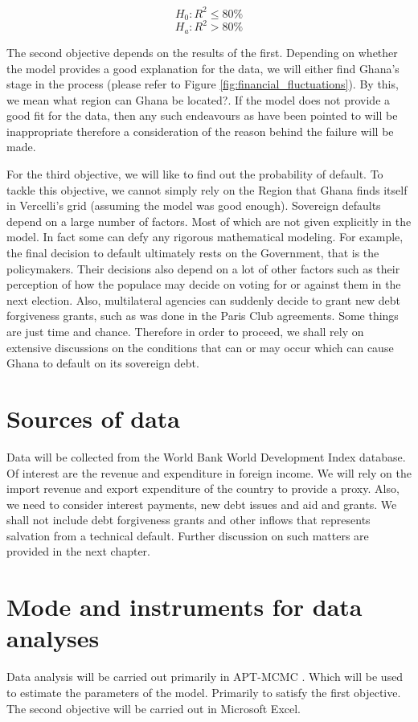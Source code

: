 \documentclass[a4paper, 12pt]{article}
\begin{document}
		\begin{equation*}
		H_0: R^2 \leq 80\%
		\end{equation*}
		\begin{equation*}
		H_a: R^2 > 80\%
		\end{equation*}
		
	The second objective depends on the results of the first. Depending on whether the model provides a good explanation for the data, we will either find Ghana's stage in the process (please refer to Figure \ref{fig:financial_fluctuations}). By this, we mean what region can Ghana be located?. If the model does not provide a good fit for the data, then any such endeavours as have been pointed to will be inappropriate therefore a consideration of the reason behind the failure will be made.
	
	For the third objective, we will like to find out the probability of default. To tackle this objective, we cannot simply rely on the Region that Ghana finds itself in Vercelli's grid (assuming the model was good enough). Sovereign defaults depend on a large number of factors. Most of which are not given explicitly in the model. In fact some can defy any rigorous mathematical modeling. For example, the final decision to default ultimately rests on the Government, that is the policymakers. Their decisions also depend on a lot of other factors such as their perception of how the populace may decide on voting for or against them in the next election. Also, multilateral agencies can suddenly decide to grant new debt forgiveness grants, such as was done in the Paris Club agreements. Some things are just time and chance. Therefore in order to proceed, we shall rely on extensive discussions on the conditions that can or may occur which can cause Ghana to default on its sovereign debt.
	\section{Sources of data}
	Data will be collected from the World Bank World Development Index database. Of interest are the revenue and expenditure in foreign income. We will rely on the import revenue and export expenditure of the country to provide a proxy. Also, we need to consider interest payments, new debt issues and aid and grants. We shall not include debt forgiveness grants and other inflows that represents salvation from a technical default. Further discussion on such matters are provided in the next chapter.
	\section{Mode and instruments for data analyses}
	Data analysis will be carried out primarily in APT-MCMC \cite{zhang2018apt}. Which will be used to estimate the parameters of the model. Primarily to satisfy the first objective. The second objective will be carried out in Microsoft Excel.
\end{document}
